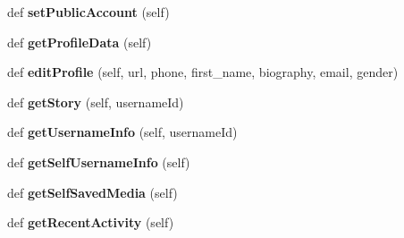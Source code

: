 \begin{DoxyCompactItemize}
\item 
\mbox{\label{class_instagram_a_p_i_1_1_instagram_a_p_i_1_1_instagram_a_p_i_a0f1cb0bef3a453d20c968c2bc2d520e2}} 
def {\bfseries set\+Public\+Account} (self)
\item 
\mbox{\label{class_instagram_a_p_i_1_1_instagram_a_p_i_1_1_instagram_a_p_i_a8a3a4eaab5cdb0007149275e60a858f9}} 
def {\bfseries get\+Profile\+Data} (self)
\item 
\mbox{\label{class_instagram_a_p_i_1_1_instagram_a_p_i_1_1_instagram_a_p_i_ae99d6c8c338d40353b43b06f573be589}} 
def {\bfseries edit\+Profile} (self, url, phone, first\+\_\+name, biography, email, gender)
\item 
\mbox{\label{class_instagram_a_p_i_1_1_instagram_a_p_i_1_1_instagram_a_p_i_aeec8830335843ed725365d8bf3512571}} 
def {\bfseries get\+Story} (self, username\+Id)
\item 
\mbox{\label{class_instagram_a_p_i_1_1_instagram_a_p_i_1_1_instagram_a_p_i_a9ab60d79f0ee845e5396d4b28e0966ff}} 
def {\bfseries get\+Username\+Info} (self, username\+Id)
\item 
\mbox{\label{class_instagram_a_p_i_1_1_instagram_a_p_i_1_1_instagram_a_p_i_aa62d1c923a6428168d12246b7edd582a}} 
def {\bfseries get\+Self\+Username\+Info} (self)
\item 
\mbox{\label{class_instagram_a_p_i_1_1_instagram_a_p_i_1_1_instagram_a_p_i_ab34d9f7819a3b5333fcf9159d055e31a}} 
def {\bfseries get\+Self\+Saved\+Media} (self)
\item 
\mbox{\label{class_instagram_a_p_i_1_1_instagram_a_p_i_1_1_instagram_a_p_i_a66212ceb7077dd7c74b54769bb514a6e}} 
def {\bfseries get\+Recent\+Activity} (self)
\item 

\end{DoxyCompactItemize}
